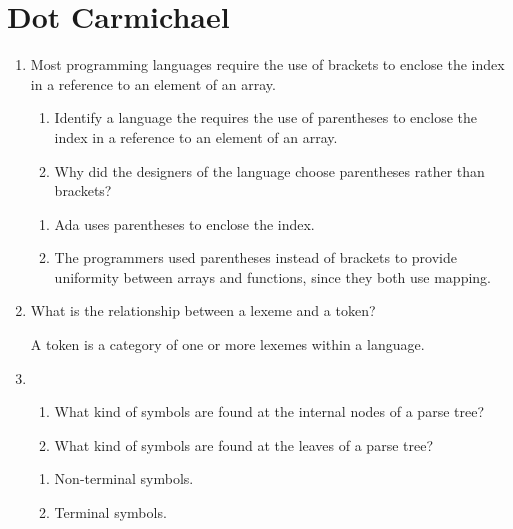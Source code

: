 
\chapter{Dot Carmichael}

\begin{enumerate}
  \item Most programming languages require the use of brackets to
    enclose the index in a reference to an element of an array.
  \begin{enumerate}
    \item Identify a language the requires the use of parentheses
      to enclose the index in a reference to an element of an array.
    \item Why did the designers of the language choose parentheses
      rather than brackets?
    \end{enumerate}

  \begin{answer}

  \begin{enumerate}
    \item Ada uses parentheses to enclose the index.
    \item The programmers used parentheses instead of brackets to provide
          uniformity between arrays and functions, since they both use
          mapping.
    \end{enumerate}

    \end{answer}
    
  \item What is the relationship between a lexeme and a token?

  \begin{answer}

    A token is a category of one or more lexemes within a language.

    \end{answer}

  \item
  \begin{enumerate}
    \item What kind of symbols are found at the internal nodes of a
      parse tree?
    \item What kind of symbols are found at the leaves of a parse tree?
    \end{enumerate}

  \begin{answer}

  \begin{enumerate}
    \item Non-terminal symbols.
    \item Terminal symbols.
    \end{enumerate}


\end{answer}
\end{enumerate}
